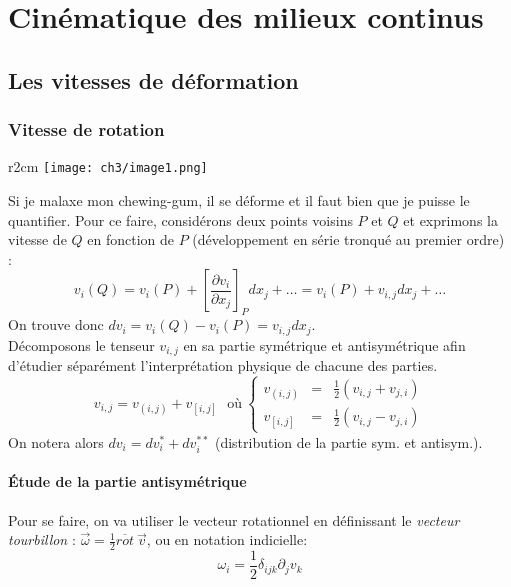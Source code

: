 \chapter{Cinématique des milieux continus}
\section{Les vitesses de déformation}

    \subsection{Vitesse de rotation}
    \begin{wrapfigure}[6]{r}{2cm}
    \texttt{[image: ch3/image1.png]}
    \end{wrapfigure}
    Si je malaxe mon chewing-gum, il se déforme et il faut bien que je puisse le quantifier.
    Pour ce faire, considérons deux points voisins $P$ et $Q$ et exprimons la vitesse de $Q$
    en fonction de $P$ (développement en série tronqué au premier ordre) : 
    \begin{equation}
    v_i(Q) = v_i(P) + \left[
    \dfrac{\partial v_i}{\partial x_j}\right]_P dx_j + \dots = v_i(P) + v_{i,j} dx_j + \dots
    \end{equation}
    On trouve donc $dv_i = v_i(Q) - v_i(P) = v_{i,j}dx_j$.\\
    
    Décomposons le tenseur $v_{i,j}$ en sa partie symétrique et antisymétrique afin d'étudier 
    séparément l'interprétation physique de chacune des parties.
    \begin{equation}
    v_{i,j} = v_{(i,j)} + v_{[i,j]}\ \ \ \text{où}\ \left\{\begin{array}{lll}
    v_{(i,j)} &=& \frac{1}{2}(v_{i,j}+v_{j,i})\\
    v_{[i,j]} &=& \frac{1}{2}(v_{i,j}-v_{j,i})
    \end{array}\right.
    \end{equation}
    On notera alors $dv_i = dv_i^* + dv_i^{**}$ (distribution de la partie sym. et antisym.).

        \subsubsection{Étude de la partie antisymétrique}
        Pour se faire, on va utiliser le vecteur rotationnel en définissant le \textit{vecteur
         tourbillon} : $\vec \omega = \frac{1}{2}\overline{rot}\ \vec{v}$, ou en notation indicielle:
         \begin{equation}
         \omega_i = \frac{1}{2}\delta_{ijk}\partial_jv_k
         \end{equation}
         

